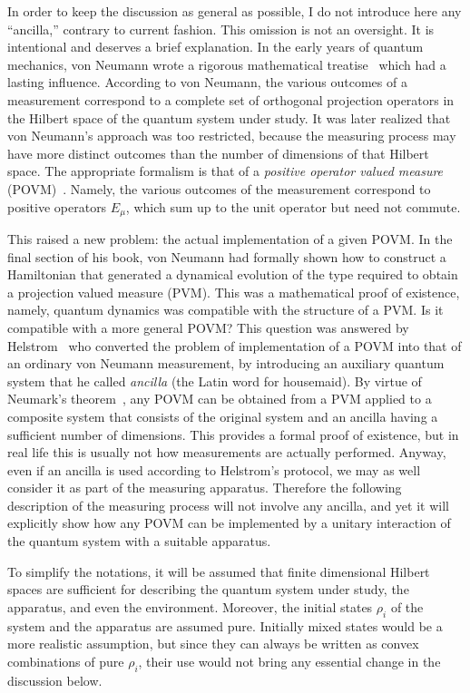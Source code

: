 \documentclass[12pt]{article}
\begin{document}
In order to keep the discussion as general as possible, I do not
introduce here any ``ancilla,'' contrary to current fashion. This
omission is not an oversight. It is intentional and deserves a brief
explanation. In the early years of quantum mechanics, von Neumann wrote
a rigorous mathematical treatise~\cite{vN} which had a lasting
influence. According to von Neumann, the various outcomes of a
measurement correspond to a complete set of orthogonal projection
operators in the Hilbert space of the quantum system under study. It was
later realized that von Neumann's approach was too restricted, because
the measuring process may have more distinct outcomes than the number of
dimensions of that Hilbert space. The appropriate formalism is that of a
{\it positive operator valued measure\/} (POVM)~\cite{JP,DL}. Namely,
the various outcomes of the measurement correspond to positive operators
$E_\mu$, which sum up to the unit operator but need not commute. 

This raised a new problem: the actual implementation of a given POVM. In
the final section of his book, von Neumann had formally shown how to
construct a Hamiltonian that generated a dynamical evolution of the type
required to obtain a projection valued measure (PVM). This was a
mathematical proof of existence, namely, quantum dynamics was compatible
with the structure of a PVM. Is it compatible with a more general POVM?
This question was answered by Helstrom~\cite{Hel} who converted the
problem of implementation of a POVM into that of an ordinary von Neumann
measurement, by introducing an auxiliary quantum system that he called
{\it ancilla\/} (the Latin word for housemaid). By virtue of Neumark's
theorem~\cite{Neu}, any POVM can be obtained from a PVM applied to a
composite system that consists of the original system and an ancilla
having a sufficient number of dimensions. This provides a formal proof
of existence, but in real life this is usually not how measurements are
actually performed. Anyway, even if an ancilla is used according to
Helstrom's protocol, we may as well consider it as part of the measuring
apparatus. Therefore the following description of the measuring process
will not involve any ancilla, and yet it will explicitly show how any
POVM can be implemented by a unitary interaction of the quantum system
with a suitable apparatus.

To simplify the notations, it will be assumed that finite dimensional
Hilbert spaces are sufficient for describing the quantum system under
study, the apparatus, and even the environment. Moreover, the initial
states $\rho_i$ of the system and the apparatus are assumed pure.
Initially mixed states would be a more realistic assumption, but since
they can always be written as convex combinations of pure $\rho_i$,
their use would not bring any essential change in the discussion below.
\end{document}
